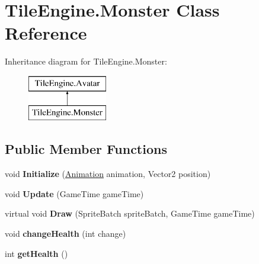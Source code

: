 \hypertarget{class_tile_engine_1_1_monster}{\section{Tile\-Engine.\-Monster Class Reference}
\label{d7/d8a/class_tile_engine_1_1_monster}
}
Inheritance diagram for Tile\-Engine.\-Monster\-:\begin{figure}[H]
\begin{center}
\leavevmode
\includegraphics[height=2.000000cm]{d7/d8a/class_tile_engine_1_1_monster}
\end{center}
\end{figure}
\subsection*{Public Member Functions}
\begin{DoxyCompactItemize}
\item 
\hypertarget{class_tile_engine_1_1_monster_a3e708e301043038c39cb5a392f2a2a6c}{void {\bfseries Initialize} (\hyperlink{class_tile_engine_1_1_animation}{Animation} animation, Vector2 position)}\label{d7/d8a/class_tile_engine_1_1_monster_a3e708e301043038c39cb5a392f2a2a6c}

\item 
\hypertarget{class_tile_engine_1_1_monster_a8fe35134525a9abb6c06bf69348de5c7}{void {\bfseries Update} (Game\-Time game\-Time)}\label{d7/d8a/class_tile_engine_1_1_monster_a8fe35134525a9abb6c06bf69348de5c7}

\item 
\hypertarget{class_tile_engine_1_1_monster_a59a438ca1791da6c25a5e849f109c0ed}{virtual void {\bfseries Draw} (Sprite\-Batch sprite\-Batch, Game\-Time game\-Time)}\label{d7/d8a/class_tile_engine_1_1_monster_a59a438ca1791da6c25a5e849f109c0ed}

\item 
\hypertarget{class_tile_engine_1_1_monster_aea7a59b9ba54ddb2571733381955274b}{void {\bfseries change\-Health} (int change)}\label{d7/d8a/class_tile_engine_1_1_monster_aea7a59b9ba54ddb2571733381955274b}

\item 
\hypertarget{class_tile_engine_1_1_monster_ae68b6e0b8425e7ebc5931316b5d17221}{int {\bfseries get\-Health} ()}\label{d7/d8a/class_tile_engine_1_1_monster_ae68b6e0b8425e7ebc5931316b5d17221}

\end{DoxyCompactItemize}
